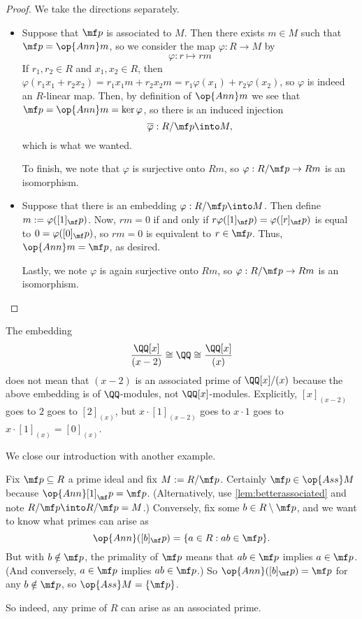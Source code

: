 \begin{proof}
	We take the directions separately.
	\begin{itemize}
		\item Suppose that $\mf p$ is associated to $M$. Then there exists $m\in M$ such that $\mf p=\op{Ann}m$, so we consider the map $\varphi:R\to M$ by
		\[\varphi:r\mapsto rm\]
		If $r_1,r_2\in R$ and $x_1,x_2\in R$, then $\varphi(r_1x_1+r_2x_2)=r_1x_1m+r_2x_2m=r_1\varphi(x_1)+r_2\varphi(x_2)$, so $\varphi$ is indeed an $R$-linear map. Then, by definition of $\op{Ann}m$ we see that $\mf p=\op{Ann}m=\ker\varphi$, so there is an induced injection
		\[\overline\varphi:R/\mf p\into M,\]
		which is what we wanted.

		To finish, we note that $\varphi$ is surjective onto $Rm$, so $\varphi:R/\mf p\to Rm$ is an isomorphism.
		\item Suppose that there is an embedding $\varphi:R/\mf p\into M$. Then define $m:=\varphi([1]_\mf p)$. Now, $rm=0$ if and only if $r\varphi([1]_\mf p)=\varphi([r]_\mf p)$ is equal to $0=\varphi([0]_\mf p)$, so $rm=0$ is equivalent to $r\in\mf p$. Thus, $\op{Ann}m=\mf p$, as desired.

		Lastly, we note $\varphi$ is again surjective onto $Rm$, so $\varphi:R/\mf p\to Rm$ is an isomorphism.
		\qedhere
	\end{itemize}
\end{proof}
\begin{remark}[Nir]
	The embedding
	\[\frac{\QQ[x]}{(x-2)}\cong\QQ\cong\frac{\QQ[x]}{(x)}\]
	does not mean that $(x-2)$ is an associated prime of $\QQ[x]/(x)$ because the above embedding is of $\QQ$-modules, not $\QQ[x]$-modules. Explicitly, $[x]_{(x-2)}$ goes to $2$ goes to $[2]_{(x)}$, but $x\cdot[1]_{(x-2)}$ goes to $x\cdot1$ goes to $x\cdot[1]_{(x)}=[0]_{(x)}$.
\end{remark}
We close our introduction with another example.
\begin{example} \label{ex:assrmodp}
	Fix $\mf p\subseteq R$ a prime ideal and fix $M:=R/\mf p$. Certainly $\mf p\in\op{Ass}M$ because $\op{Ann}[1]_\mf p=\mf p$. (Alternatively, use \autoref{lem:betterassociated} and note $R/\mf p\into R/\mf p=M$.) Conversely, fix some $b\in R\setminus\mf p$, and we want to know what primes can arise as
	\[\op{Ann}([b]_\mf p)=\{a\in R:ab\in\mf p\}.\]
	But with $b\notin\mf p$, the primality of $\mf p$ means that $ab\in\mf p$ implies $a\in\mf p$. (And conversely, $a\in\mf p$ implies $ab\in\mf p$.) So $\op{Ann}([b]_\mf p)=\mf p$ for any $b\notin\mf p$, so $\op{Ass}M=\{\mf p\}$.
\end{example}
So indeed, any prime of $R$ can arise as an associated prime.

